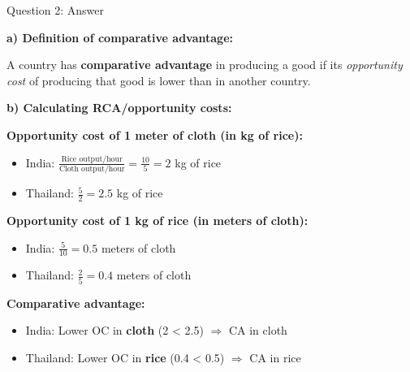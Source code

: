 \documentclass{beamer}
\begin{document}

\begin{frame}{Question 2: Answer}

\textbf{a) Definition of comparative advantage:}

A country has \textbf{comparative advantage} in producing a good if its \textit{opportunity cost} of producing that good is lower than in another country.

\vspace{0.3cm}

\textbf{b) Calculating RCA/opportunity costs:}

\vspace{0.2cm}

\textbf{Opportunity cost of 1 meter of cloth (in kg of rice):}
\begin{itemize}
    \item \textcolor{homecolor}{India:} $\frac{\text{Rice output/hour}}{\text{Cloth output/hour}} = \frac{10}{5} = 2$ kg of rice
    \item \textcolor{foreigncolor}{Thailand:} $\frac{5}{2} = 2.5$ kg of rice
\end{itemize}

\vspace{0.2cm}

\textbf{Opportunity cost of 1 kg of rice (in meters of cloth):}
\begin{itemize}
    \item \textcolor{homecolor}{India:} $\frac{5}{10} = 0.5$ meters of cloth
    \item \textcolor{foreigncolor}{Thailand:} $\frac{2}{5} = 0.4$ meters of cloth
\end{itemize}

\vspace{0.3cm}

\textbf{Comparative advantage:}
\begin{itemize}
    \item \textcolor{homecolor}{India}: Lower OC in \textbf{cloth} (2 < 2.5) $\Rightarrow$ CA in cloth
    \item \textcolor{foreigncolor}{Thailand}: Lower OC in \textbf{rice} (0.4 < 0.5) $\Rightarrow$ CA in rice
\end{itemize}

\end{frame}

\end{document}
